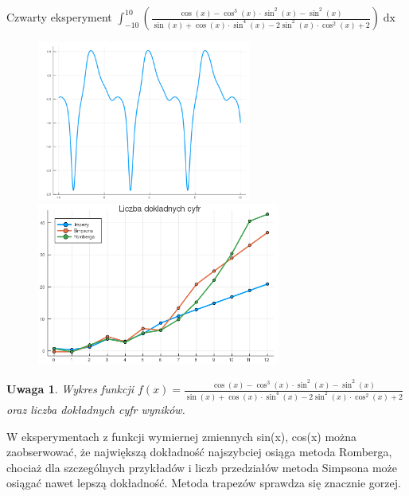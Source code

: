 \documentclass[11pt,wide]{article}
\newtheorem{remark}{Uwaga}
\begin{document}
Czwarty eksperyment \(\displaystyle \int_{-10}^{10} \left(\frac{\cos(x) - \cos^3(x) \cdot \sin^2(x) - \sin^2(x)}{\sin(x) + \cos(x)\cdot \sin^4(x) - 2 \sin^2(x) \cdot \cos^2(x) + 2}\right)\mathop{dx} \)
\begin{figure}[h!]
	\includegraphics[width=70mm,scale=0.5]{tryg4}
	\includegraphics[width=80mm,scale=0.5]{tryg_blad4}
\end{figure}
\begin{remark}
\centering
Wykres funkcji \(\displaystyle f(x) = \frac{\cos(x) - \cos^3(x) \cdot \sin^2(x) - \sin^2(x)}{\sin(x) + \cos(x)\cdot \sin^4(x) - 2 \sin^2(x) \cdot \cos^2(x) + 2}\) oraz liczba dokładnych cyfr wyników.
\end{remark}


W eksperymentach z funkcji wymiernej zmiennych sin(x), cos(x) można zaobserwować, że największą dokładność najszybciej osiąga metoda Romberga, chociaż dla szczególnych przykładów i liczb przedziałów metoda Simpsona może osiągać nawet lepszą dokładność. Metoda trapezów sprawdza się znacznie gorzej.
\pagebreak
\end{document}
